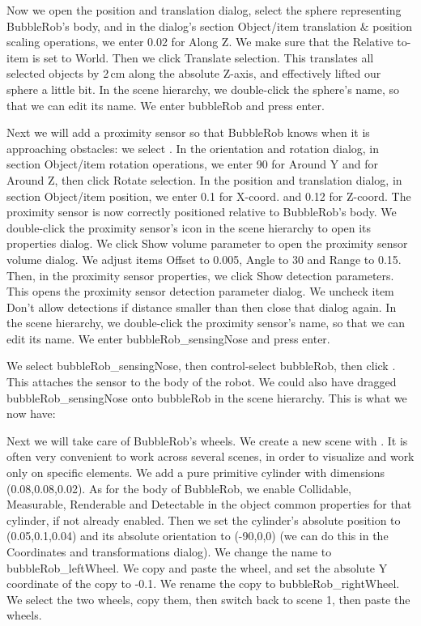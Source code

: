 Now we open the position and translation dialog, select the sphere 
representing BubbleRob's body, and in the dialog's section Object/item 
translation \& position scaling operations, we enter 0.02 for Along Z. We 
make sure that the Relative to-item is set to World. Then we click Translate
selection. This translates all selected objects by 2\,cm along the absolute 
Z-axis, and effectively lifted our sphere a little bit. In the scene 
hierarchy, we double-click the sphere's name, so that we can edit its name.
We enter bubbleRob and press enter.

Next we will add a proximity sensor so that BubbleRob knows when it is 
approaching obstacles: we select
. 
In the orientation and rotation dialog, in section Object/item 
rotation operations, we enter 90 for Around Y and for Around Z, then click
Rotate selection. In the position and translation dialog, in section 
Object/item position, we enter 0.1 for X-coord. and 0.12 for Z-coord. The 
proximity sensor is now correctly positioned relative to BubbleRob's body. 
We double-click the proximity sensor's icon in the scene hierarchy to open
its properties dialog. We click Show volume parameter to open the proximity
sensor volume dialog. We adjust items Offset to 0.005, Angle to 30 and Range
to 0.15. Then, in the proximity sensor properties, we click Show detection
parameters. This opens the proximity sensor detection parameter dialog. We
uncheck item Don't allow detections if distance smaller than then close that
dialog again. In the scene hierarchy, we double-click the proximity sensor's 
name, so that we can edit its name. We enter bubbleRob\_sensingNose 
and press enter.

We select bubbleRob\_sensingNose, then control-select bubbleRob, then click
. This attaches the sensor 
to the body of the robot. We could also have dragged bubbleRob\_sensingNose 
onto bubbleRob in the scene hierarchy. This is what we now have:


Next we will take care of BubbleRob's wheels. We create a new scene with
. It is often very convenient to work across 
several scenes, in order to visualize and work only on specific elements. 
We add a pure primitive cylinder with dimensions (0.08,0.08,0.02). As for 
the body of BubbleRob, we enable Collidable, Measurable, Renderable and 
Detectable in the object common properties for that cylinder, if not already
enabled. Then we set the cylinder's absolute position to (0.05,0.1,0.04) 
and its absolute orientation to (-90,0,0) (we can do this in the Coordinates
and transformations dialog). We change the name to bubbleRob\_leftWheel. We
copy and paste the wheel, and set the absolute Y coordinate of the copy to
-0.1. We rename the copy to bubbleRob\_rightWheel. We select the two wheels,
copy them, then switch back to scene 1, then paste the wheels.

